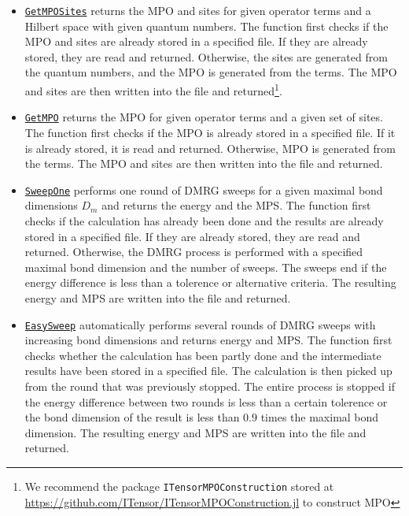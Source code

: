 \documentclass{timesjhep}
\begin{document}
\begin{itemize}
    \item \href{https://docs.fuzzified.world/itensors/\#FuzzifiED.GetMPOSites-Tuple{String,\%20Union{Sum{Scaled{ComplexF64,\%20Prod{Op}}},\%20Vector{Term}},\%20Vector{QNDiag}}}{\lstinline|GetMPOSites|} returns the MPO and sites for given operator terms and a Hilbert space with given quantum numbers. The function first checks if the MPO and sites are already stored in a specified file. If they are already stored, they are read and returned. Otherwise, the sites are generated from the quantum numbers, and the MPO is generated from the terms. The MPO and sites are then written into the file and returned\footnote{We recommend the package \lstinline[basicstyle=\ttfamily\scriptsize]|ITensorMPOConstruction| stored at \url{https://github.com/ITensor/ITensorMPOConstruction.jl} to construct MPO}.
    \item \href{https://docs.fuzzified.world/itensors/\#FuzzifiED.GetMPO-Tuple{String,\%20Union{Sum{Scaled{ComplexF64,\%20Prod{Op}}},\%20Vector{Term}},\%20Vector{\%3C:Index}}}{\lstinline|GetMPO|} returns the MPO for given operator terms and a given set of sites. The function first checks if the MPO is already stored in a specified file. If it is already stored, it is read and returned. Otherwise, MPO is generated from the terms. The MPO and sites are then written into the file and returned. 
    \item \href{https://docs.fuzzified.world/itensors/\#FuzzifiED.SweepOne-Tuple{String,\%20MPO,\%20MPS,\%20Int64}}{\lstinline|SweepOne|} performs one round of DMRG sweeps for a given maximal bond dimensions $D_m$ and returns the energy and the MPS. The function first checks if the calculation has already been done and the results are already stored in a specified file. If they are already stored, they are read and returned. Otherwise, the DMRG process is performed with a specified maximal bond dimension and the number of sweeps. The sweeps end if the energy difference is less than a tolerence or alternative criteria. The resulting energy and MPS are written into the file and returned.
    \item \href{https://docs.fuzzified.world/itensors/\#FuzzifiED.EasySweep-Tuple{String,\%20MPO,\%20MPS}}{\lstinline|EasySweep|} automatically performs several rounds of DMRG sweeps with increasing bond dimensions and returns energy and MPS. The function first checks whether the calculation has been partly done and the intermediate results have been stored in a specified file. The calculation is then picked up from the round that was previously stopped. The entire process is stopped if the energy difference between two rounds is less than a certain tolerence or the bond dimension of the result is less than $0.9$ times the maximal bond dimension. The resulting energy and MPS are written into the file and returned.
\end{itemize}
\end{document}

